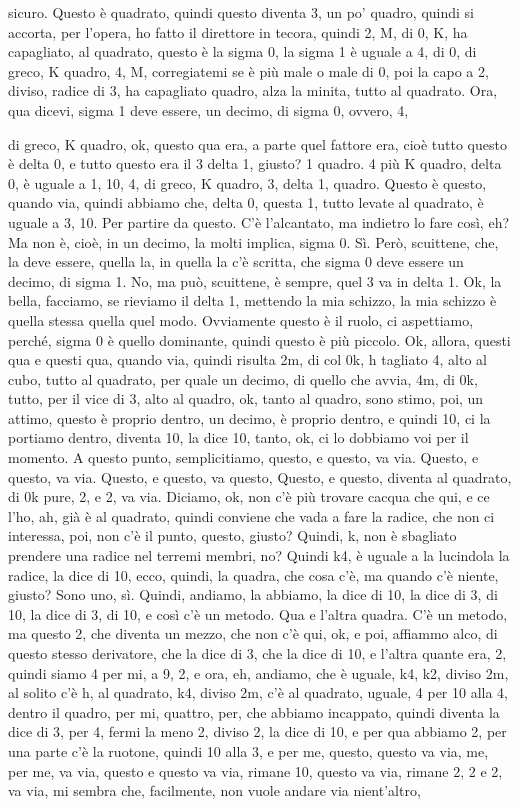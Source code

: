 \begin{soluzione}
{sicuro. Questo è quadrato, quindi questo diventa 3, un po' quadro, quindi si accorta, per l'opera, ho fatto il direttore in tecora, quindi 2, M, di 0, K, ha capagliato, al quadrato, questo è la sigma 0, la sigma 1 è uguale a 4, di 0, di greco, K quadro, 4, M, corregiatemi se è più male o male di 0, poi la capo a 2, diviso, radice di 3, ha capagliato quadro, alza la minita, tutto al quadrato. Ora, qua dicevi, sigma 1 deve essere, un decimo, di sigma 0, ovvero, 4,
   
   di greco, K quadro, ok, questo qua era, a parte quel fattore era, cioè tutto questo è delta 0, e tutto questo era il 3 delta 1, giusto? 1 quadro. 4 più K quadro, delta 0, è uguale a 1, 10, 4, di greco, K quadro, 3, delta 1, quadro. Questo è questo, quando via, quindi abbiamo che, delta 0, questa 1, tutto levate al quadrato, è uguale a 3, 10. Per partire da questo. C'è l'alcantato, ma indietro lo fare così, eh? Ma non è, cioè, in un decimo, la molti implica, sigma 0. Sì. Però, scuittene, che, la deve essere, quella la, in quella la c'è scritta, che sigma 0 deve essere un decimo, di sigma 1. No, ma può, scuittene, è sempre, quel 3 va in delta 1. Ok, la bella, facciamo, se rieviamo il delta 1, mettendo la mia schizzo, la mia schizzo è quella stessa quella quel modo. Ovviamente questo è il ruolo, ci aspettiamo, perché, sigma 0 è quello dominante, quindi questo è più piccolo. Ok, allora, questi qua e questi qua, quando via, quindi risulta 2m, di col 0k, h tagliato 4, alto al cubo, tutto al quadrato, per quale un decimo, di quello che avvia, 4m, di 0k, tutto, per il vice di 3, alto al quadro, ok, tanto al quadro, sono stimo, poi, un attimo, questo è proprio dentro, un decimo, è proprio dentro, e quindi 10, ci la portiamo dentro, diventa 10, la dice 10, tanto, ok, ci lo dobbiamo voi per il momento. A questo punto, semplicitiamo, questo, e questo, va via. Questo, e questo, va via. Questo, e questo, va questo, Questo, e questo, diventa al quadrato, di 0k pure, 2, e 2, va via. Diciamo, ok, non c'è più trovare cacqua che qui, e ce l'ho, ah, già è al quadrato, quindi conviene che vada a fare la radice, che non ci interessa, poi, non c'è il punto, questo, giusto? Quindi, k, non è sbagliato prendere una radice nel terremi membri, no? Quindi k4, è uguale a la lucindola la radice, la dice di 10, ecco, quindi, la quadra, che cosa c'è, ma quando c'è niente, giusto? Sono uno, sì. Quindi, andiamo, la abbiamo, la dice di 10, la dice di 3, di 10, la dice di 3, di 10, e così c'è un metodo. Qua e l'altra quadra. C'è un metodo, ma questo 2, che diventa un mezzo, che non c'è qui, ok, e poi, affiammo alco, di questo stesso derivatore, che la dice di 3, che la dice di 10, e l'altra quante era, 2, quindi siamo 4 per mi, a 9, 2, e ora, eh, andiamo, che è uguale, k4, k2, diviso 2m, al solito c'è h, al quadrato, k4, diviso 2m, c'è al quadrato, uguale, 4 per 10 alla 4, dentro il quadro, per mi, quattro, per, che abbiamo incappato, quindi diventa la dice di 3, per 4, fermi la meno 2, diviso 2, la dice di 10, e per qua abbiamo 2, per una parte c'è la ruotone, quindi 10 alla 3, e per me, questo, questo va via, me, per me, va via, questo e questo va via, rimane 10, questo va via, rimane 2, 2 e 2, va via, mi sembra che, facilmente, non vuole andare via nient'altro, }
\end{soluzione}
